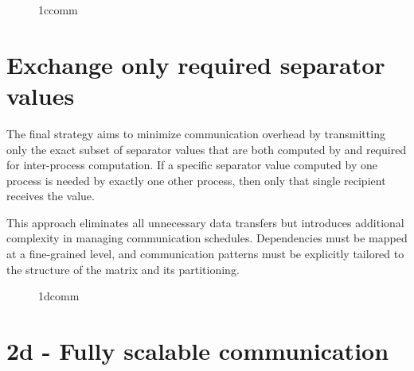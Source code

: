 \begin{figure}[ht]
    \centering
    \caption{1ccomm}
    \label{fig:1ccomm}
\end{figure}

\section{Exchange only required separator values}
The final strategy aims to minimize communication overhead by transmitting only the exact subset of separator values that are both computed by and required for inter-process computation. If a specific separator value computed by one process is needed by exactly one other process, then only that single recipient receives the value.

This approach eliminates all unnecessary data transfers but introduces additional complexity in managing communication schedules. Dependencies must be mapped at a fine-grained level, and communication patterns must be explicitly tailored to the structure of the matrix and its partitioning.

\begin{figure}[ht]
    \centering
    \caption{1dcomm}
    \label{fig:1dcomm}
\end{figure}

\section{2d - Fully scalable communication}
